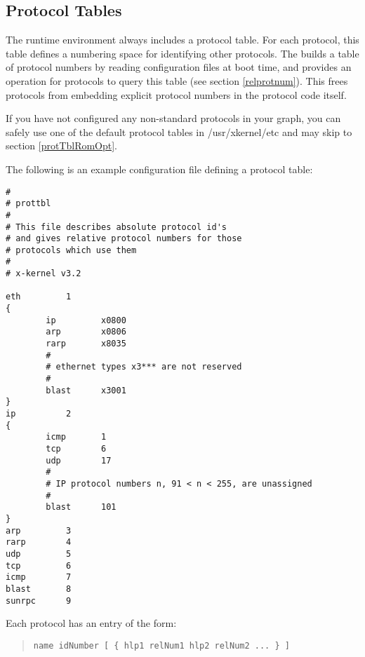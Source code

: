 % 
%
%
%
%
%
%
%

\subsection{Protocol Tables}
\label{protnum}

The \xk{} runtime environment always includes a protocol table.
For each protocol, this table defines a numbering space for
identifying other protocols.  The \xk{} builds a table of protocol
numbers by reading configuration files at boot time, and provides an
operation for protocols to query this table (see section
\ref{relprotnum}).  This frees protocols from embedding explicit
protocol numbers in the protocol code itself.

If you have not configured any non-standard protocols in your graph,
you can safely use one of the default protocol tables in {\sanss
/usr/xkernel/etc} and may skip to section \ref{protTblRomOpt}.

The following is an example configuration
file defining a protocol table:

\begin{verbatim}
#
# prottbl
#
# This file describes absolute protocol id's 
# and gives relative protocol numbers for those
# protocols which use them
#
# x-kernel v3.2

eth         1    
{
        ip         x0800
        arp        x0806
        rarp       x8035
        #
        # ethernet types x3*** are not reserved
        #
        blast      x3001
}
ip          2
{
        icmp       1
        tcp        6
        udp        17
        #
        # IP protocol numbers n, 91 < n < 255, are unassigned
        #
        blast      101
}
arp         3
rarp        4
udp         5
tcp         6
icmp        7
blast       8
sunrpc      9

\end{verbatim}

\noindent Each protocol has an entry of the form:

\medskip

\begin{quote}
{\tt name   idNumber    [ \{  hlp1  relNum1  hlp2 relNum2  ... \} ] }
\end{quote}

